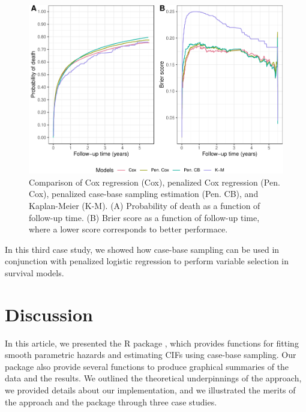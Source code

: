 \begin{Schunk}
\begin{figure}[ht]
\includegraphics[width=\textwidth,keepaspectratio=true]{../figures/riskregressionBrier-1} \caption{\label{fig:cs3FinalBrier} Comparison of Cox regression (Cox), penalized Cox regression (Pen. Cox), penalized case-base sampling estimation (Pen. CB), and Kaplan-Meier (K-M). (A)  Probability of death as a function of follow-up time. (B) Brier score as a function of follow-up time, where a lower score corresponds to better performace.}\label{fig:riskregressionBrier}
\end{figure}
\end{Schunk}

In this third case study, we showed how case-base sampling can be used
in conjunction with penalized logistic regression to perform variable
selection in survival models.

\hypertarget{discussion}{%
\section{Discussion}\label{discussion}}

In this article, we presented the \textsf{R} package ,
which provides functions for fitting smooth parametric hazards and
estimating CIFs using case-base sampling. Our package also provide
several functions to produce graphical summaries of the data and the
results. We outlined the theoretical underpinnings of the approach, we
provided details about our implementation, and we illustrated the merits
of the approach and the package through three case studies.

